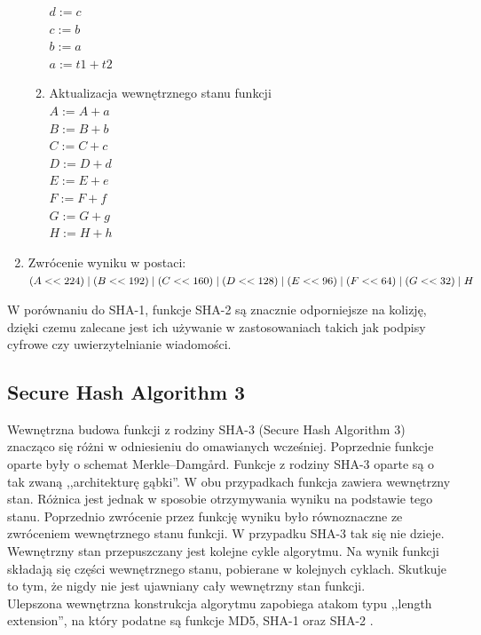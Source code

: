 \begin{enumerate}
\begin{enumerate}
		        $d := c$ \\
		        $c := b$ \\
		        $b := a$ \\
		        $a := t1 + t2$
			\item Aktualizacja wewnętrznego stanu funkcji \\
				$A := A + a$ \\
				$B := B + b$ \\
				$C := C + c$ \\
				$D := D + d$ \\
				$E := E + e$ \\
				$F := F + f$ \\
				$G := G + g$ \\
				$H := H + h$ 
		\end{enumerate}
	\item Zwrócenie wyniku w postaci: \\
		$(A << 224) \mathrel{|} (B << 192) \mathrel{|} (C << 160) \mathrel{|} \\ 
		 (D << 128) \mathrel{|} (E << 96) \mathrel{|} (F << 64) \mathrel{|} (G << 32) \mathrel{|} H$
\end{enumerate}
W porównaniu do SHA-1, funkcje SHA-2 są znacznie odporniejsze na kolizję, dzięki czemu zalecane jest ich używanie w zastosowaniach takich jak podpisy cyfrowe czy uwierzytelnianie wiadomości.

\subsection{Secure Hash Algorithm 3}
Wewnętrzna budowa funkcji z rodziny SHA-3 (Secure Hash Algorithm 3) znacząco się różni w odniesieniu do omawianych wcześniej. 
Poprzednie funkcje oparte były o schemat Merkle–Damgård. 
Funkcje z rodziny SHA-3 oparte są o tak zwaną ,,architekturę gąbki''. 
W obu przypadkach funkcja zawiera wewnętrzny stan. 
Różnica jest jednak w sposobie otrzymywania wyniku na podstawie tego stanu. 
Poprzednio zwrócenie przez funkcję wyniku było równoznaczne ze zwróceniem wewnętrznego stanu funkcji. 
W przypadku SHA-3 tak się nie dzieje. Wewnętrzny stan przepuszczany jest kolejne cykle algorytmu. 
Na wynik funkcji składają się części wewnętrznego stanu, pobierane w kolejnych cyklach. 
Skutkuje to tym, że nigdy nie jest ujawniany cały wewnętrzny stan funkcji. \\
Ulepszona wewnętrzna konstrukcja algorytmu zapobiega atakom typu ,,length extension'', 
na który podatne są funkcje MD5, SHA-1 oraz SHA-2 \cite{keccak}.

